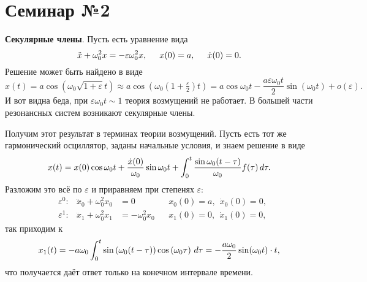 \section{Семинар №2}



\textbf{Секулярные члены}. Пусть есть уравнение вида
\begin{equation*}
    \ddot{x} + \omega_0^2 x = - \varepsilon \omega_0^2 x,\hspace{5 mm} 
    x(0) = a,
    \hspace{5 mm} \dot{x} (0) = 0.
\end{equation*}
Решение может быть найдено в виде
\begin{equation*}
    x(t) = a \cos \left(\omega_0 \sqrt{1 + \varepsilon} t\right) \approx  
    a \cos\left(\omega_0 \left(1 + \tfrac{\varepsilon}{2}\right)t\right) = a \cos \omega_0 t - \frac{a \varepsilon \omega_0 t}{2} \sin (\omega_0 t) + o(\varepsilon).
\end{equation*}
И вот видна беда, при $\varepsilon \omega_0 t \sim 1$ теория возмущений не работает. В большей части резонансных систем возникают секулярные члены. 

Получим этот результат в терминах теории возмущений. Пусть есть тот же гармонический осциллятор, заданы начальные условия, и знаем решение в виде
\begin{equation*}
    x(t) = x(0) \cos \omega_0 t + \frac{\dot{x}(0)}{\omega_0} \sin \omega_0 t + \int_{0}^{t} \frac{\sin \omega_0 (t-\tau)}{\omega_0} f(\tau) \, d \tau.
\end{equation*}
Разложим это всё по $\varepsilon$ и приравняем при степенях $\varepsilon$:
\begin{align*}
    &\varepsilon^0: 
    & \ddot{x}_0 + \omega_0^2 x_0 &= 0 
    &&x_0(0)= a, \ \ \dot{x}_0(0) = 0, \\
    &\varepsilon^1: 
    & \ddot{x}_1 + \omega_0^2 x_1 &= - \omega_0^2 x_0 
    &&x_1(0)= 0, \ \ \dot{x}_1(0) = 0,
\end{align*}
так приходим к
\begin{equation*}
    x_1 (t) = - a \omega_0 \int_{0}^{t} \sin \left(\omega_0 (t-\tau)\right) \cos \left(\omega_0 \tau\right) \, d \tau = - \frac{a \omega_0}{2} \sin (\omega_0 t) \cdot t,
\end{equation*}
что получается даёт ответ только на конечном интервале времени. 

